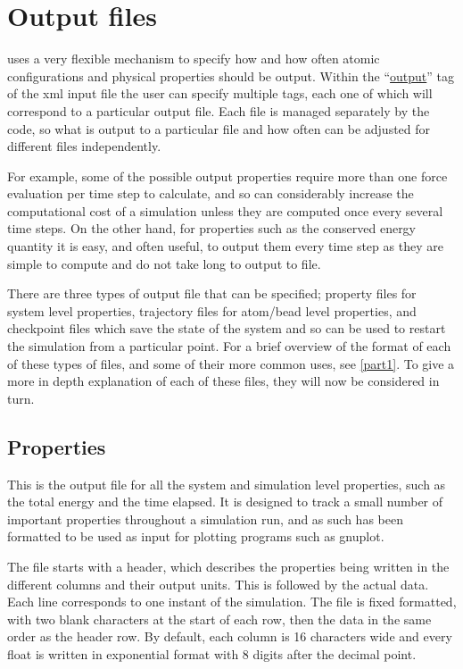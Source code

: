 \documentclass[11pt,english,fleqn]{report}
\begin{document}
\section{Output files}

\label{outputfiles}

\ipi uses a very flexible mechanism to specify how and how often
atomic configurations and physical properties should be output. Within
the {}``\hyperref[OUTPUTS]{output}'' tag of the xml input
file the user can specify multiple tags, each one of
which will correspond to a particular output
file. Each file is managed separately by the code, so what is output
to a particular file and how often can be adjusted for different files independently.

For example, some of the possible output properties require more than
one force evaluation per time step to calculate, and so can considerably
increase the computational cost of a simulation unless they are computed
once every several time steps. On the other hand,
for properties such as the conserved energy quantity it is easy, and
often useful, to output them every time step as they are simple to
compute and do not take long to output to file.

There are three types of output file that can be specified; property
files for system level properties, trajectory files for atom/bead
level properties, and checkpoint files which save the state of the
system and so can be used to restart the simulation from a particular
point. For a brief overview of the format of each of these types of
files, and some of their more common uses, see \ref{part1}.
To give a more in depth explanation of each of these files,
they will now be considered in turn.


\subsection{Properties}

\label{propertyfile}

This is the output file for all the system and simulation level properties,
such as the total energy and the time elapsed. It is designed to
track a small number of important properties throughout a
simulation run, and as such has been formatted to be used as input
for plotting programs such as gnuplot.

The file starts with
a header, which describes the properties being written in the different
columns and their output units. This is followed by the actual
data. Each line corresponds to one instant of the simulation.
The file is fixed formatted, with two blank characters at the start
of each row, then the data in the same order as the header row. By default, each
column is 16 characters wide and every float is written in exponential
format with 8 digits after the decimal point.
\end{document}
